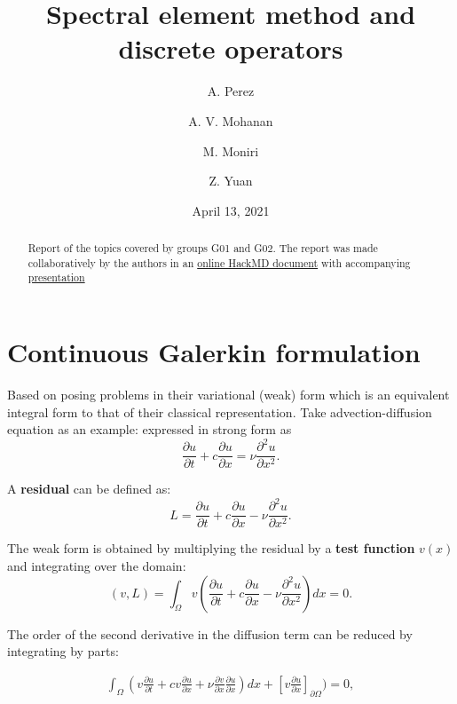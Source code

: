 \documentclass[
  a4paper,
  10pt]{article}
\title{Spectral element method and discrete operators}
\author{A. Perez \and A. V. Mohanan \and M. Moniri \and Z. Yuan}
\date{April 13, 2021}
\begin{document}
\maketitle
\begin{abstract}
Report of the topics covered by groups G01 and G02. The report was made
collaboratively by the authors in an
\href{https://hackmd.io/@jmtW1K-nT5O31NGGrCd6Pg/ByZNQkZH_}{online HackMD
document} with accompanying
\href{https://hackmd.io/@ashwinvis/B1PY2JorO}{presentation}
\end{abstract}

\hypertarget{continuous-galerkin-formulation}{%
\section{Continuous Galerkin
formulation}\label{continuous-galerkin-formulation}}

Based on posing problems in their variational (weak) form which is an
equivalent integral form to that of their classical representation. Take
advection-diffusion equation as an example: expressed in strong form as
\begin{equation}
\frac{\partial{u}}{\partial{t}} + c \frac{\partial{u}}{\partial{x}} =  \nu \frac{\partial^{2}u}{\partial{x}^{2}}.
\end{equation}

A \textbf{residual} can be defined as: \begin{equation}
L=\frac{\partial{u}}{\partial{t}} + c \frac{\partial{u}}{\partial{x}} -  \nu \frac{\partial^{2}u}{\partial{x}^{2}}.
\end{equation}

The weak form is
obtained by multiplying the residual by a \textbf{test function}
\(v(x)\) and integrating over the domain: \begin{equation}
(v,L)=\int_{\Omega} v(\frac{\partial{u}}{\partial{t}} + c \frac{\partial{u}}{\partial{x}} -  \nu \frac{\partial^{2}u}{\partial{x}^{2}})dx=0.
\end{equation}

The order of the second derivative in the diffusion term can be reduced
by integrating by parts:

\begin{align}
\int_{\Omega} (v\frac{\partial u}{\partial t} + cv\frac{\partial u}{\partial x} + \nu\frac{\partial v}{\partial x}\frac{\partial u}{\partial x})dx + [v\frac{\partial u}{\partial x}]_{\partial\Omega}) = 0,
\end{align}
\end{document}
